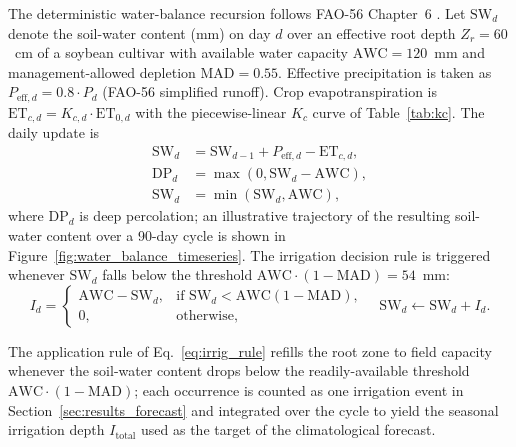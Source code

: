 \documentclass[review,5p,times]{elsarticle}
\begin{document}
The deterministic water-balance recursion follows FAO-56 Chapter~6
\cite{Allen1998}. Let $\mathrm{SW}_d$ denote the soil-water content
(mm) on day $d$ over an effective root depth $Z_r = 60$~cm of a
soybean cultivar with available water capacity $\mathrm{AWC} = 120$~mm
and management-allowed depletion $\mathrm{MAD} = 0.55$. Effective
precipitation is taken as $P_{\mathrm{eff},d} = 0.8 \cdot P_d$
(FAO-56 simplified runoff). Crop evapotranspiration is
$\mathrm{ET}_{c,d} = K_{c,d} \cdot \mathrm{ET}_{0,d}$ with the
piecewise-linear $K_c$ curve of Table~\ref{tab:kc}. The daily update
is
%
\begin{equation}
\begin{aligned}
\mathrm{SW}_d &= \mathrm{SW}_{d-1} + P_{\mathrm{eff},d} - \mathrm{ET}_{c,d}, \\
\mathrm{DP}_d &= \max(0, \mathrm{SW}_d - \mathrm{AWC}), \\
\mathrm{SW}_d &= \min(\mathrm{SW}_d, \mathrm{AWC}),
\end{aligned}
\label{eq:wb_daily}
\end{equation}
%
where $\mathrm{DP}_d$ is deep percolation; an illustrative
trajectory of the resulting soil-water content over a 90-day cycle
is shown in Figure~\ref{fig:water_balance_timeseries}. The
irrigation decision rule is triggered whenever $\mathrm{SW}_d$
falls below the threshold $\mathrm{AWC} \cdot (1-\mathrm{MAD}) =
54$~mm:
%
\begin{equation}
I_d =
\begin{cases}
\mathrm{AWC} - \mathrm{SW}_d, & \text{if } \mathrm{SW}_d < \mathrm{AWC}(1-\mathrm{MAD}), \\
0, & \text{otherwise},
\end{cases}
\quad \mathrm{SW}_d \leftarrow \mathrm{SW}_d + I_d.
\label{eq:irrig_rule}
\end{equation}

The application rule of Eq.~\ref{eq:irrig_rule} refills the root
zone to field capacity whenever the soil-water content drops below
the readily-available threshold $\mathrm{AWC}\cdot(1-\mathrm{MAD})$;
each occurrence is counted as one irrigation event in
Section~\ref{sec:results_forecast} and integrated over the cycle to
yield the seasonal irrigation depth $I_{\mathrm{total}}$ used as the
target of the climatological forecast.
\end{document}
